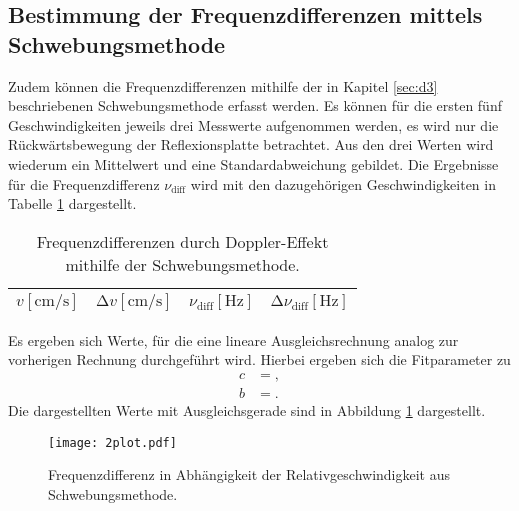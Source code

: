 \subsection{Bestimmung der Frequenzdifferenzen mittels Schwebungsmethode}
Zudem können die Frequenzdifferenzen mithilfe der in Kapitel \ref{sec:d3} beschriebenen Schwebungsmethode erfasst werden.
Es können für die ersten fünf Geschwindigkeiten jeweils drei Messwerte aufgenommen werden, es wird nur die Rückwärtsbewegung der Reflexionsplatte betrachtet.
Aus den drei Werten wird wiederum ein Mittelwert und eine Standardabweichung gebildet.
Die Ergebnisse für die Frequenzdifferenz $\nu_{\text{diff}}$ wird mit den dazugehörigen Geschwindigkeiten in Tabelle \ref{tab:diffe2} dargestellt.
\begin{table}
  \centering
  \caption{Frequenzdifferenzen durch Doppler-Effekt mithilfe der Schwebungsmethode.}
  \label{tab:diffe2}
  \begin{tabular}{c c c c}
    \toprule
    {$v [\si{\centi\metre\per\second}]$} & {$\increment{v} [\si{\centi\metre\per\second}]$} & {$\nu_{\text{diff}} [\si{\hertz}]$} & {$\increment{\nu_{\text{diff}}} [\si{\hertz}]$}\\
    \midrule
    
    \bottomrule
  \end{tabular}
\end{table}
Es ergeben sich Werte, für die eine lineare Ausgleichsrechnung analog zur vorherigen Rechnung durchgeführt wird.
Hierbei ergeben sich die Fitparameter zu
\begin{align*}
  c &= , \\
  b &= .
\end{align*}
Die dargestellten Werte mit Ausgleichsgerade sind in Abbildung \ref{afig:2} dargestellt.
\begin{figure}
  \centering
  \texttt{[image: 2plot.pdf]}
  \caption{Frequenzdifferenz in Abhängigkeit der Relativgeschwindigkeit aus Schwebungsmethode.}
  \label{afig:2}
\end{figure}
%
%    
%
